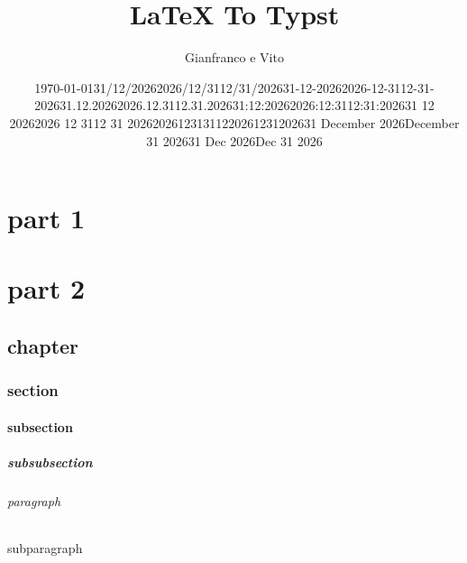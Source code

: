 \documentclass{book}
\title{LaTeX To Typst}
\author{Gianfranco e Vito}
\date{\today}
\date{31/12/2026}
\date{2026/12/31}
\date{12/31/2026}
\date{31-12-2026}
\date{2026-12-31}
\date{12-31-2026}
\date{31.12.2026}
\date{2026.12.31}
\date{12.31.2026}
\date{31:12:2026}
\date{2026:12:31}
\date{12:31:2026}
\date{31 12 2026}
\date{2026 12 31}
\date{12 31 2026}
\date{20261231}
\date{31122026}
\date{12312026}
\date{31 December 2026}
\date{December 31 2026}
\date{31 Dec 2026}
\date{Dec 31 2026}
\begin{document}
\maketitle
\tableofcontents

\part{part 1}
\part{part 2}
\chapter{chapter}
\section{section}
\subsection{subsection}
\subsubsection{subsubsection}
\paragraph{paragraph}
\subparagraph{subparagraph}
\end{document}
